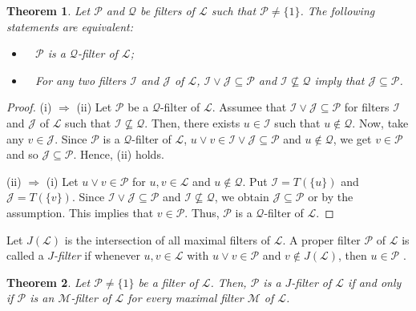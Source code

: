 \documentclass[preprint,review,10pt]{amsart}
\newtheorem{theorem}{Theorem}[section]
\theoremstyle{definition}
\theoremstyle{remark}
\numberwithin{equation}{section}
\begin{document}
\begin{theorem} \label{2}
Let $\mathcal{P}$ and $ \mathcal{Q}$ be   filters  of $\mathcal{L}$ such that  $\mathcal{P} \neq \{1\}$.  The following statements are equivalent: 
\begin{itemize} 
\item[\rm(i)]~ $\mathcal{P}$ is a  $\mathcal{Q}$-filter of $\mathcal{L}$;
\item[\rm(ii)]~  For any two filters $\mathcal{I}$ and $\mathcal{J}$  of $\mathcal{L}$, $\mathcal{I} \vee \mathcal{J} \subseteq \mathcal{P}$ and $\mathcal{I} \nsubseteq \mathcal{Q}$ imply that   $\mathcal{J}  \subseteq \mathcal{P} $.
\end{itemize}
\end{theorem}
\begin{proof}
(i) $\Longrightarrow$ (ii) Let $\mathcal{P}$ be a  $\mathcal{Q}$-filter of $\mathcal{L}$. Assumee that $\mathcal{I} \vee \mathcal{J} \subseteq \mathcal{P}$ for filters  $\mathcal{I}$ and $\mathcal{J}$  of $\mathcal{L}$ such that $\mathcal{I}  \nsubseteq  \mathcal{Q}$. Then, there exists $u \in \mathcal{I}$ such that $ u \notin  \mathcal{Q}$. Now, take any $v \in \mathcal{J}$.  Since  $\mathcal{P}$ is a  $\mathcal{Q}$-filter of $\mathcal{L}$, $ u \vee v \in \mathcal{I} \vee \mathcal{J} \subseteq \mathcal{P}$ and $u \notin \mathcal{Q}$, we get  $v \in \mathcal{P}$ and so $\mathcal{J}  \subseteq \mathcal{P} $.   Hence, (ii) holds.

(ii) $\Longrightarrow$ (i) Let $u \vee v \in \mathcal{P}$ for $u,v \in \mathcal{L}$ and $u \notin \mathcal{Q}$. Put $\mathcal{I}=T(\{u\})$ and $\mathcal{J}=T(\{v\})$.   Since  $\mathcal{I} \vee \mathcal{J} \subseteq \mathcal{P}$ and $\mathcal{I} \nsubseteq \mathcal{Q}$, we obtain $\mathcal{J} \subseteq \mathcal{P}$ or  by the assumption. This implies that $v \in \mathcal{P}$. Thus, $\mathcal{P}$ is a $\mathcal{Q}$-filter of $\mathcal{L}$.
\end{proof}
Let $J(\mathcal{L})$ is the intersection of all maximal filters of $\mathcal{L}$. A proper ﬁlter $\mathcal{P}$ of $\mathcal{L}$ is called a {\it $J$-ﬁlter} if whenever $u,v \in \mathcal{L}$ with $u \vee v \in \mathcal{P}$ and $v \notin J(\mathcal{L})$, then $u \in \mathcal{P}$ \cite{Atani6}.
\begin{theorem} \label{3}
Let $\mathcal{P} \neq \{1\}$ be   a filter of $\mathcal{L}$.  Then,  $\mathcal{P}$ is a  $J$-filter of $\mathcal{L}$ if and only if  $\mathcal{P}$ is an  $\mathcal{M}$-filter of $\mathcal{L}$ for every maximal filter $\mathcal{M}$ of $\mathcal{L}$.
\end{theorem}
\end{document}

